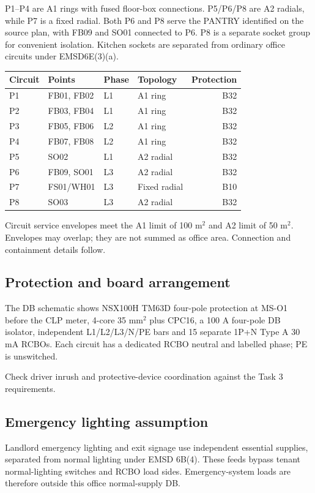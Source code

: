 P1--P4 are A1 rings with fused floor-box connections. P5/P6/P8 are A2 radials, while P7 is a fixed radial. Both P6 and P8 serve the PANTRY identified on the source plan, with FB09 and SO01 connected to P6. P8 is a separate socket group for convenient isolation. Kitchen sockets are separated from ordinary office circuits under EMSD6E(3)(a).
\begin{center}\begin{tabular}{llllr}\toprule
Circuit & Points & Phase & Topology & Protection\\\midrule

P1 & FB01, FB02 & L1 & A1 ring & B32 \\
P2 & FB03, FB04 & L1 & A1 ring & B32 \\
P3 & FB05, FB06 & L2 & A1 ring & B32 \\
P4 & FB07, FB08 & L2 & A1 ring & B32 \\
P5 & SO02 & L1 & A2 radial & B32 \\
P6 & FB09, SO01 & L3 & A2 radial & B32 \\
P7 & FS01/WH01 & L3 & Fixed radial & B10 \\
P8 & SO03 & L3 & A2 radial & B32 \\

\bottomrule\end{tabular}\end{center}
Circuit service envelopes meet the A1 limit of 100 m$^2$ and A2 limit of 50 m$^2$. Envelopes may overlap; they are not summed as office area. Connection and containment details follow.
\clearpage

\subsection*{Protection and board arrangement}
The DB schematic shows NSX100H TM63D four-pole protection at MS-O1 before the CLP meter, 4-core 35 mm$^2$ plus CPC16, a 100 A four-pole DB isolator, independent L1/L2/L3/N/PE bars and 15 separate 1P+N Type A 30 mA RCBOs. Each circuit has a dedicated RCBO neutral and labelled phase; PE is unswitched.

Check driver inrush and protective-device coordination against the Task 3 requirements.
\subsection*{Emergency lighting assumption}
Landlord emergency lighting and exit signage use independent essential supplies, separated from normal lighting under EMSD 6B(4). These feeds bypass tenant normal-lighting switches and RCBO load sides. Emergency-system loads are therefore outside this office normal-supply DB.
